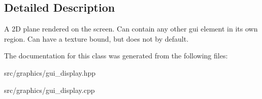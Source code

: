 \subsection{Detailed Description}
A 2D plane rendered on the screen. Can contain any other gui element in its own region. Can have a texture bound, but does not by default. 

The documentation for this class was generated from the following files\+:\begin{DoxyCompactItemize}
\item 
src/graphics/gui\+\_\+display.\+hpp\item 
src/graphics/gui\+\_\+display.\+cpp\end{DoxyCompactItemize}
